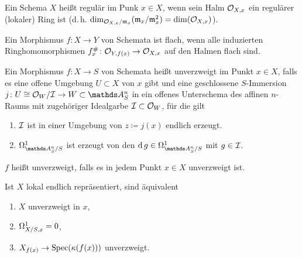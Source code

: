\documentclass[german]{scrreprt}
\begin{document}
\begin{Definition}[Regulär]
Ein Schema $X$ heißt regulär im Punk $x\in X$, wenn sein Halm
$\mathcal{O}_{X,x}$ ein regulärer (lokaler) Ring ist
(d.\,h. $\dim_{\mathcal{O}_{X,x}/\mathfrak{m}_x}(\mathfrak{m}_x/\mathfrak{m}_x^2)=\dim(\mathcal{O}_{X,x})$).
\end{Definition}

\begin{Definition}
Ein Morphismus $f\colon X\to Y$ von Schemata ist flach, wenn alle
induzierten Ringhomomorphismen $f_x^\#\colon \mathcal{O}_{Y,f(x)}\to\mathcal{O}_{X,x}$  auf
den Halmen flach sind.
\cite[]{bosch, goodreduction}
\end{Definition}

\begin{Definition}
  Ein Morphismus $f\colon X\to S$ von Schemata heißt unverzweigt im
  Punkt $x\in X$, falls es eine offene Umgebung
  $U\subset X$ von $x$ gibt und eine geschlossene $S$-Immersion
  $j\colon U\cong\O_W/\I\to W\subset\A_S^n$ in ein offenes Unterschema
  des affinen $n$-Raums mit zugehöriger Idealgarbe $\mathcal{I}\subset\mathcal{O}_W$,
  für die gilt
  \begin{enumerate}[label=(\alph*)]
  \item $\mathcal{I}$ ist in einer Umgebung von $z\coloneqq j(x)$ endlich erzeugt.
  \item $\Om{\A_S^n/S}$ ist erzeugt von den $\d g\in\Om{\A_S^n/S}$
    mit $g\in\mathcal{I}$.
  \end{enumerate}
  $f$ heißt unverzweigt, falls es in jedem Punkt $x\in X$
  unverzweigt ist.
  \begin{Bemerkung}
    Ist $X$ lokal endlich repräsentiert, sind äquivalent
    \begin{enumerate}[label=(\roman*)]
    \item $X$ unverzweigt in $x$,
    \item $\Omega_{X/S,x}^1=0$,
    \item $X_{f(x)}\to \operatorname{Spec}(\kappa(f(x)))$ unverzweigt.
    \end{enumerate}
    \cite[8.4, Theorem 3]{bosch}
  \end{Bemerkung}
\end{Definition}
\end{document}
